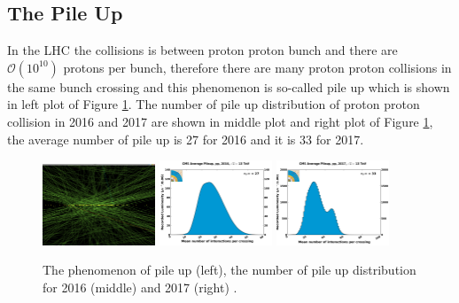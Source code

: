 \subsection{The Pile Up}\label{sec:LHC_pileup}
In the LHC the collisions is between proton proton bunch and there are $\mathcal{O}(10^{10})$ protons per bunch, therefore there are many proton proton collisions in the same bunch crossing and this phenomenon is so-called pile up which is shown in left plot of Figure \ref{fig:LHC_pileup}. The number of pile up distribution of proton proton collision in 2016 and 2017 are shown in middle plot and right plot of Figure \ref{fig:LHC_pileup}, the average number of pile up is 27 for 2016 and it is 33 for 2017.
\begin{figure}[h!]
\begin{center}
\includegraphics[width=0.3\textwidth]{figures/LHC/pile-up.png}
\includegraphics[width=0.3\textwidth]{figures/LHC/pileup_pp_2016.png}
\includegraphics[width=0.3\textwidth]{figures/LHC/pileup_pp_2017.png}
\caption{The phenomenon of pile up (left), the number of pile up distribution for 2016 (middle) and 2017 (right) \cite{CMS_Luminosity}.}
\label{fig:LHC_pileup}
\end{center}
\end{figure}
